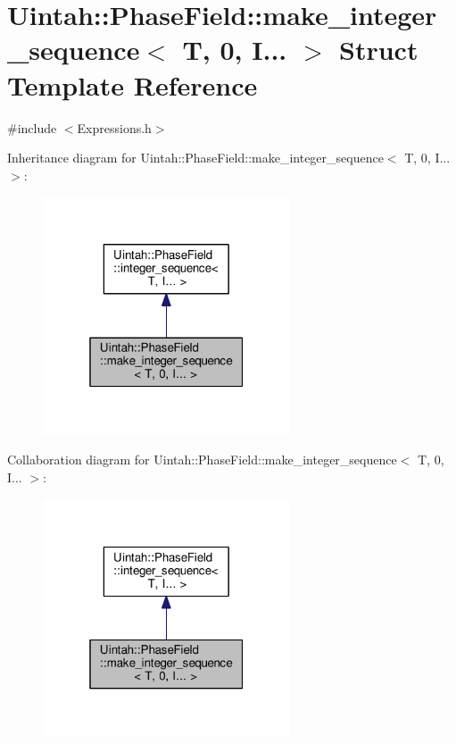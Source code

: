 \hypertarget{structUintah_1_1PhaseField_1_1make__integer__sequence_3_01T_00_010_00_01I_8_8_8_01_4}{}\section{Uintah\+:\+:Phase\+Field\+:\+:make\+\_\+integer\+\_\+sequence$<$ T, 0, I... $>$ Struct Template Reference}
\label{structUintah_1_1PhaseField_1_1make__integer__sequence_3_01T_00_010_00_01I_8_8_8_01_4}


{\ttfamily \#include $<$Expressions.\+h$>$}



Inheritance diagram for Uintah\+:\+:Phase\+Field\+:\+:make\+\_\+integer\+\_\+sequence$<$ T, 0, I... $>$\+:\nopagebreak
\begin{figure}[H]
\begin{center}
\leavevmode
\includegraphics[width=208pt]{structUintah_1_1PhaseField_1_1make__integer__sequence_3_01T_00_010_00_01I_8_8_8_01_4__inherit__graph}
\end{center}
\end{figure}


Collaboration diagram for Uintah\+:\+:Phase\+Field\+:\+:make\+\_\+integer\+\_\+sequence$<$ T, 0, I... $>$\+:\nopagebreak
\begin{figure}[H]
\begin{center}
\leavevmode
\includegraphics[width=208pt]{structUintah_1_1PhaseField_1_1make__integer__sequence_3_01T_00_010_00_01I_8_8_8_01_4__coll__graph}
\end{center}
\end{figure}
